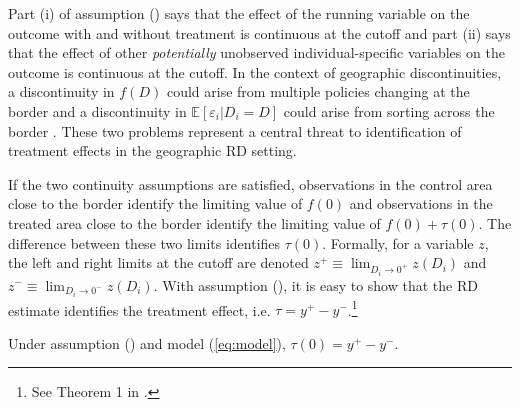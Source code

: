 \documentclass[12pt]{article}
\begin{document}
Part (i) of assumption () says that the effect of the running variable on the outcome with and without treatment is continuous at the cutoff and part (ii) says that the effect of other \emph{potentially} unobserved individual-specific variables on the outcome is continuous at the cutoff. In the context of geographic discontinuities, a discontinuity in $f(D)$ could arise from multiple policies changing at the border and a discontinuity in $\mathbb{E}\left[ \varepsilon_i \vert D_i = D \right]$ could arise from sorting across the border \citep{Keele_Titiunik_2015}. These two problems represent a central threat to identification of treatment effects in the geographic RD setting. 

If the two continuity assumptions are satisfied, observations in the control area close to the border identify the limiting value of $f(0)$ and observations in the treated area close to the border identify the limiting value of $f(0) + \tau(0)$. The difference between these two limits identifies $\tau(0)$. Formally, for a variable $z$, the left and right limits at the cutoff are denoted $z^+ \equiv \lim_{D_i \to 0^+} z(D_i)$ and $z^- \equiv \lim_{D_i \to 0^-} z(D_i)$. With assumption (), it is easy to show that the RD estimate identifies the treatment effect, i.e. $\tau = y^+ - y^-$.\footnote{See Theorem 1 in \citet{Hahn_Todd_Klaauw_2001}.} 

\begin{theorem}[RD Identification]
    Under assumption () and model (\ref{eq:model}), $\tau(0) = y^+ - y^-$.
\end{theorem}



\end{document}
